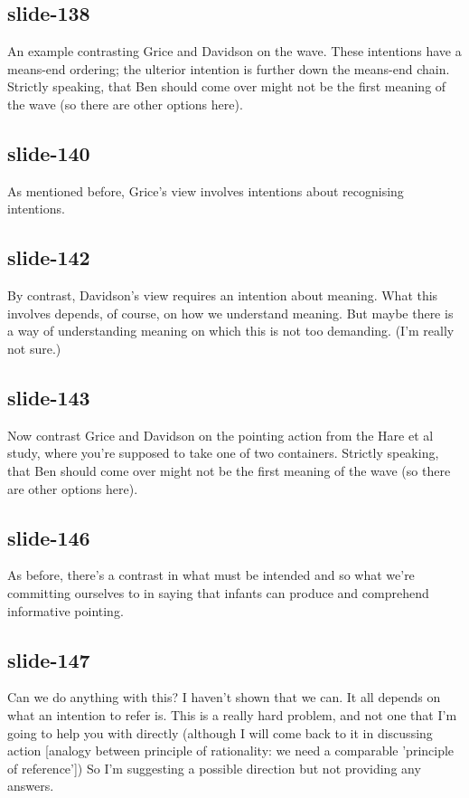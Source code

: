 \documentclass[12pt,\papersize]{extarticle}
\begin{document}
 
\subsection{slide-138}
An example contrasting Grice and Davidson on the wave.
These intentions have a means-end ordering; the ulterior intention is further down the means-end chain.
Strictly speaking, that Ben should come over might not be the first meaning of the wave (so there are other options here).
 
 
\subsection{slide-140}
As mentioned before, Grice's view involves intentions about recognising intentions.
 
 
\subsection{slide-142}
By contrast, Davidson's view requires an intention about meaning.
What this involves depends, of course, on how we understand meaning.
But maybe there is a way of understanding meaning on which this is not too demanding. (I'm really not sure.)
 
 
\subsection{slide-143}
Now contrast Grice and Davidson on the pointing action from the Hare et al study, where you're supposed to take one of two containers.
Strictly speaking, that Ben should come over might not be the first meaning of the wave (so there are other options here).
 
 
\subsection{slide-146}
As before, there's a contrast in what must be intended and so what we're committing ourselves to in saying that infants can produce and comprehend informative pointing.
 
 
\subsection{slide-147}
Can we do anything with this?
I haven't shown that we can.
It all depends on what an intention to refer is.
This is a really hard problem, and not one that I'm going to help you with directly (although I will come back to it in discussing action [analogy between principle of rationality: we need a comparable 'principle of reference'])
So I'm suggesting a possible direction but not providing any answers.
 
\end{document}
